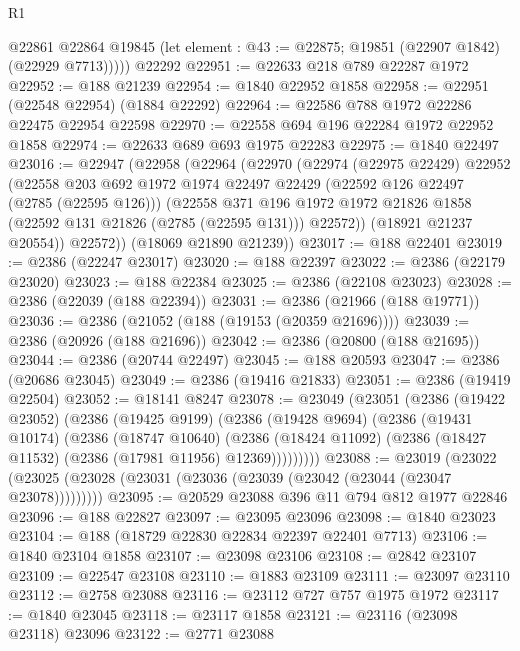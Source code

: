 \begin{lexlean}{R1}
\begin{coremodule}
          @22861
          @22864
          @19845
          (let element : @43 := @22875; @19851 (@22907 @1842) (@22929 @7713)))))
    @22292
@22951 := @22633 @218 @789 @22287 @1972
@22952 := @188 @21239
@22954 := @1840 @22952 @1858
@22958 := @22951 (@22548 @22954) (@1884 @22292)
@22964 := @22586 @788 @1972 @22286 @22475 @22954 @22598
@22970 := @22558 @694 @196 @22284 @1972 @22952 @1858
@22974 := @22633 @689 @693 @1975 @22283
@22975 := @1840 @22497
@23016 := @22947
    (@22958
      (@22964
        (@22970
          (@22974
            (@22975 @22429)
            @22952
            (@22558
              @203
              @692
              @1972
              @1974
              @22497
              @22429
              (@22592 @126 @22497 (@2785 (@22595 @126)))
              (@22558
                @371
                @196
                @1972
                @1972
                @21826
                @1858
                (@22592 @131 @21826 (@2785 (@22595 @131)))
                @22572))
            (@18921 @21237 @20554))
          @22572))
      (@18069 @21890 @21239))
@23017 := @188 @22401
@23019 := @2386 (@22247 @23017)
@23020 := @188 @22397
@23022 := @2386 (@22179 @23020)
@23023 := @188 @22384
@23025 := @2386 (@22108 @23023)
@23028 := @2386 (@22039 (@188 @22394))
@23031 := @2386 (@21966 (@188 @19771))
@23036 := @2386 (@21052 (@188 (@19153 (@20359 @21696))))
@23039 := @2386 (@20926 (@188 @21696))
@23042 := @2386 (@20800 (@188 @21695))
@23044 := @2386 (@20744 @22497)
@23045 := @188 @20593
@23047 := @2386 (@20686 @23045)
@23049 := @2386 (@19416 @21833)
@23051 := @2386 (@19419 @22504)
@23052 := @18141 @8247
@23078 := @23049
    (@23051
      (@2386
        (@19422 @23052)
        (@2386
          (@19425 @9199)
          (@2386
            (@19428 @9694)
            (@2386
              (@19431 @10174)
              (@2386
                (@18747 @10640)
                (@2386 (@18424 @11092) (@2386 (@18427 @11532) (@2386 (@17981 @11956) @12369)))))))))
@23088 := @23019
    (@23022 (@23025 (@23028 (@23031 (@23036 (@23039 (@23042 (@23044 (@23047 @23078)))))))))
@23095 := @20529 @23088 @396 @11 @794 @812 @1977 @22846
@23096 := @188 @22827
@23097 := @23095 @23096
@23098 := @1840 @23023
@23104 := @188 (@18729 @22830 @22834 @22397 @22401 @7713)
@23106 := @1840 @23104 @1858
@23107 := @23098 @23106
@23108 := @2842 @23107
@23109 := @22547 @23108
@23110 := @1883 @23109
@23111 := @23097 @23110
@23112 := @2758 @23088
@23116 := @23112 @727 @757 @1975 @1972
@23117 := @1840 @23045
@23118 := @23117 @1858
@23121 := @23116 (@23098 @23118) @23096
@23122 := @2771 @23088

\end{coremodule}
\end{lexlean}
